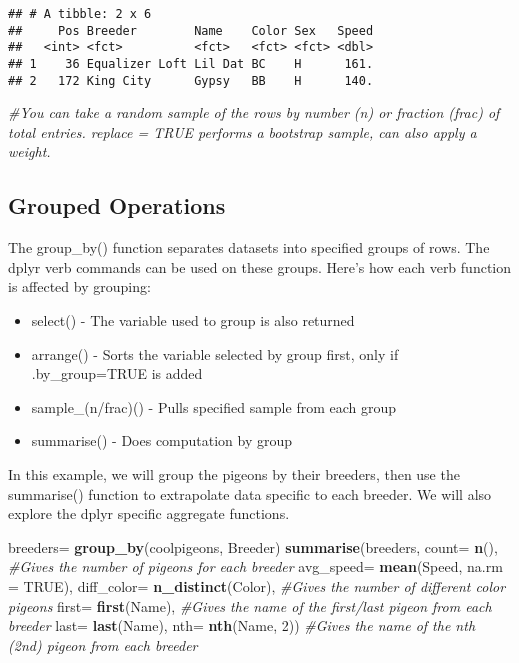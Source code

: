 \documentclass[]{article}
\newenvironment{Shaded}{\begin{snugshade}}{\end{snugshade}}
\newcommand{\KeywordTok}[1]{\textcolor[rgb]{0.13,0.29,0.53}{\textbf{#1}}}
\newcommand{\DataTypeTok}[1]{\textcolor[rgb]{0.13,0.29,0.53}{#1}}
\newcommand{\DecValTok}[1]{\textcolor[rgb]{0.00,0.00,0.81}{#1}}
\newcommand{\StringTok}[1]{\textcolor[rgb]{0.31,0.60,0.02}{#1}}
\newcommand{\CommentTok}[1]{\textcolor[rgb]{0.56,0.35,0.01}{\textit{#1}}}
\newcommand{\OtherTok}[1]{\textcolor[rgb]{0.56,0.35,0.01}{#1}}
\newcommand{\NormalTok}[1]{#1}
\providecommand{\tightlist}{%
  \setlength{\itemsep}{0pt}\setlength{\parskip}{0pt}}
\begin{document}
\begin{verbatim}
## # A tibble: 2 x 6
##     Pos Breeder        Name    Color Sex   Speed
##   <int> <fct>          <fct>   <fct> <fct> <dbl>
## 1    36 Equalizer Loft Lil Dat BC    H      161.
## 2   172 King City      Gypsy   BB    H      140.
\end{verbatim}

\begin{Shaded}
\begin{Highlighting}[]
\CommentTok{#You can take a random sample of the rows by number (n) or fraction (frac) of total entries. replace = TRUE performs a bootstrap sample, can also apply a weight.}
\end{Highlighting}
\end{Shaded}

\subsection{Grouped Operations}\label{grouped-operations}

The group\_by() function separates datasets into specified groups of
rows. The dplyr verb commands can be used on these groups. Here's how
each verb function is affected by grouping:

\begin{itemize}
\tightlist
\item
  select() - The variable used to group is also returned
\item
  arrange() - Sorts the variable selected by group first, only if
  .by\_group=TRUE is added
\item
  sample\_(n/frac)() - Pulls specified sample from each group
\item
  summarise() - Does computation by group
\end{itemize}

In this example, we will group the pigeons by their breeders, then use
the summarise() function to extrapolate data specific to each breeder.
We will also explore the dplyr specific aggregate functions.

\begin{Shaded}
\begin{Highlighting}[]
\NormalTok{breeders=}\StringTok{ }\KeywordTok{group_by}\NormalTok{(coolpigeons, Breeder)}
\KeywordTok{summarise}\NormalTok{(breeders, }
          \DataTypeTok{count=} \KeywordTok{n}\NormalTok{(), }\CommentTok{#Gives the number of pigeons for each breeder}
          \DataTypeTok{avg_speed=} \KeywordTok{mean}\NormalTok{(Speed, }\DataTypeTok{na.rm =} \OtherTok{TRUE}\NormalTok{),}
          \DataTypeTok{diff_color=} \KeywordTok{n_distinct}\NormalTok{(Color), }\CommentTok{#Gives the number of different color pigeons}
          \DataTypeTok{first=} \KeywordTok{first}\NormalTok{(Name), }\CommentTok{#Gives the name of the first/last pigeon from each breeder}
          \DataTypeTok{last=} \KeywordTok{last}\NormalTok{(Name),}
          \DataTypeTok{nth=} \KeywordTok{nth}\NormalTok{(Name, }\DecValTok{2}\NormalTok{)) }\CommentTok{#Gives the name of the nth (2nd) pigeon from each breeder}
\end{Highlighting}
\end{Shaded}
\end{document}
